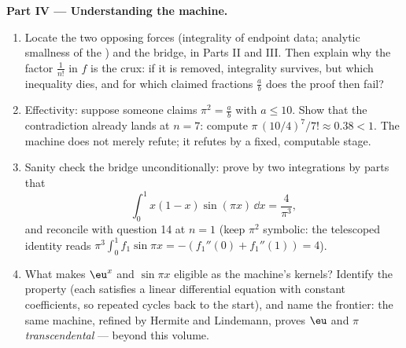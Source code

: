 \begin{problem}
\medskip
\noindent\textbf{Part IV --- Understanding the machine.}
\begin{enumerate}[resume]
  \item Locate the two opposing forces (integrality of endpoint
        data; analytic smallness of the ) and the
        bridge, in Parts II and III. Then explain why the factor
        $\frac{1}{n!}$ in $f$ is the crux: if it is removed,
        integrality survives, but which inequality dies, and for
        which claimed fractions $\frac ab$ does the proof then
        fail?
  \item Effectivity: suppose someone claims $\pi^2 = \frac ab$
        with $a \leq 10$. Show that the contradiction already
        lands at $n = 7$: compute $\pi\,(10/4)^7/7! \approx
        0.38 < 1$. The machine does not merely refute; it
        refutes by a fixed, computable stage.
  \item Sanity check the bridge unconditionally: prove by two
        integrations by parts that
        \[
        \int_0^1 x(1 - x)\sin(\pi x)\,\dd x = \frac{4}{\pi^3},
        \]
        and reconcile with question 14 at $n = 1$ (keep
        $\pi^2$ symbolic: the telescoped identity reads $\pi^3
        \int_0^1 f_1 \sin \pi x = -(f_1''(0) + f_1''(1)) = 4$).
  \item What makes $\eu^x$ and $\sin \pi x$ eligible as the
        machine's kernels? Identify the property (each satisfies
        a linear differential equation with constant
        coefficients, so repeated  cycles
        back to the start), and name the frontier: the same
        machine, refined by Hermite and Lindemann, proves $\eu$
        and $\pi$ \emph{transcendental} --- beyond this volume.
\end{enumerate}


\end{problem}
